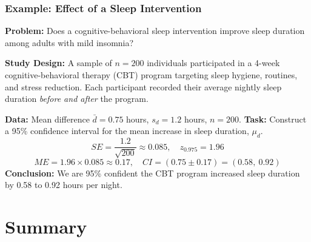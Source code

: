 \documentclass[handout]{beamer}
\begin{document}
\begin{frame}
\frametitle{Example: Effect of a Sleep Intervention}
\small 
\textbf{Problem:} Does a cognitive-behavioral sleep intervention improve sleep duration among adults with mild insomnia? 

\textbf{Study Design:} A sample of $n = 200$ individuals participated in a 4-week cognitive-behavioral therapy (CBT) program targeting sleep hygiene, routines, and stress reduction. Each participant recorded their average nightly sleep duration \textit{before and after} the program. \newline

\textbf{Data:} Mean difference $\bar{d} = 0.75$ hours, $s_d = 1.2$ hours, $n=200$. \newline
\textbf{Task:} Construct a 95\% confidence interval for the mean increase in sleep duration, $\mu_d$. \pause
\[
SE = \frac{1.2}{\sqrt{200}} \approx 0.085,\quad z_{0.975} = 1.96
\]
\[
ME = 1.96 \times 0.085 \approx 0.17,\quad CI = (0.75 \pm 0.17) = (0.58,\ 0.92)
\]
\textbf{Conclusion:} We are 95\% confident the CBT program increased sleep duration by 0.58 to 0.92 hours per night.
\end{frame}




\section{Summary}

\end{document}
